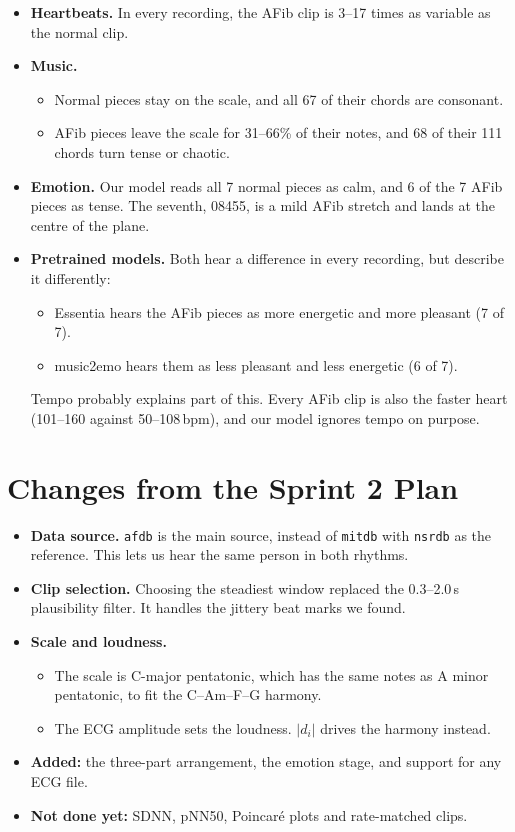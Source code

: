 \documentclass[11pt,a4paper]{article}
\begin{document}
\begin{itemize}
  \item \textbf{Heartbeats.} In every recording, the AFib clip is 3--17 times as variable as the
    normal clip.
  \item \textbf{Music.}
    \begin{itemize}
      \item Normal pieces stay on the scale, and all 67 of their chords are consonant.
      \item AFib pieces leave the scale for 31--66\% of their notes, and 68 of their 111 chords
        turn tense or chaotic.
    \end{itemize}
  \item \textbf{Emotion.} Our model reads all 7 normal pieces as calm, and 6 of the 7 AFib pieces
    as tense. The seventh, 08455, is a mild AFib stretch and lands at the centre of the plane.
  \item \textbf{Pretrained models.} Both hear a difference in every recording, but describe it
    differently:
    \begin{itemize}
      \item Essentia hears the AFib pieces as more energetic and more pleasant (7 of 7).
      \item music2emo hears them as less pleasant and less energetic (6 of 7).
    \end{itemize}
    Tempo probably explains part of this. Every AFib clip is also the faster heart (101--160
    against 50--108\,bpm), and our model ignores tempo on purpose.
\end{itemize}

\section{Changes from the Sprint 2 Plan}
\begin{itemize}
  \item \textbf{Data source.} \texttt{afdb} is the main source, instead of \texttt{mitdb} with
    \texttt{nsrdb} as the reference. This lets us hear the same person in both rhythms.
  \item \textbf{Clip selection.} Choosing the steadiest window replaced the 0.3--2.0\,s
    plausibility filter. It handles the jittery beat marks we found.
  \item \textbf{Scale and loudness.}
    \begin{itemize}
      \item The scale is C-major pentatonic, which has the same notes as A minor pentatonic, to
        fit the C--Am--F--G harmony.
      \item The ECG amplitude sets the loudness. $|d_i|$ drives the harmony instead.
    \end{itemize}
  \item \textbf{Added:} the three-part arrangement, the emotion stage, and support for any ECG
    file.
  \item \textbf{Not done yet:} SDNN, pNN50, Poincar\'e plots and rate-matched clips.
\end{itemize}
\end{document}
